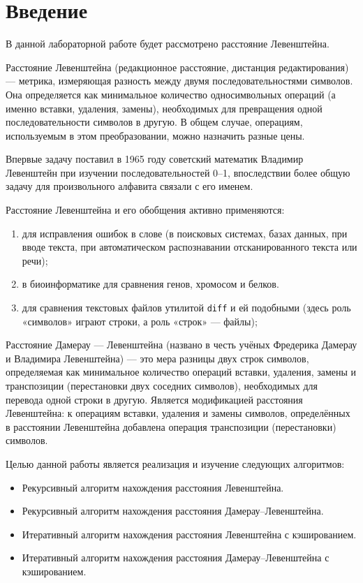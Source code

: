 \chapter*{Введение}

В данной лабораторной работе будет рассмотрено расстояние Левенштейна.

Расстояние Левенштейна \cite{Levenshtein} (редакционное расстояние, дистанция редактирования) — метрика, измеряющая разность между двумя последовательностями символов. Она определяется как минимальное количество односимвольных операций (а именно вставки, удаления, замены), необходимых для превращения одной последовательности символов в другую. В общем случае, операциям, используемым в этом преобразовании, можно назначить разные цены.

Впервые задачу поставил в 1965 году советский математик Владимир Левенштейн при изучении последовательностей 0--1, впоследствии более общую задачу для произвольного алфавита связали с его именем.

Расстояние Левенштейна и его обобщения активно применяются: 
\begin{enumerate}[label={\arabic*)}]
	\item для исправления ошибок в слове (в поисковых системах, базах данных, при вводе текста, при автоматическом распознавании отсканированного текста или речи);
	\item в биоинформатике для сравнения генов, хромосом и белков.
	\item для сравнения текстовых файлов утилитой \texttt{diff} и ей подобными (здесь роль «символов» играют строки, а роль «строк» — файлы);
\end{enumerate}

Расстояние Дамерау — Левенштейна (названо в честь учёных Фредерика Дамерау и Владимира Левенштейна) — это мера разницы двух строк символов, определяемая как минимальное количество операций вставки, удаления, замены и транспозиции (перестановки двух соседних символов), необходимых для перевода одной строки в другую. Является модификацией расстояния Левенштейна: к операциям вставки, удаления и замены символов, определённых в расстоянии Левенштейна добавлена операция транспозиции (перестановки) символов.

Целью данной работы является реализация и изучение следующих алгоритмов:
\begin{itemize}
	\item Рекурсивный алгоритм нахождения расстояния Левенштейна.
	\item Рекурсивный алгоритм нахождения расстояния Дамерау--Левенштейна.
	\item Итеративный алгоритм нахождения расстояния Левенштейна с кэшированием.
	\item Итеративный алгоритм нахождения расстояния Дамерау--Левенштейна с \newline кэшированием.
\end{itemize}

